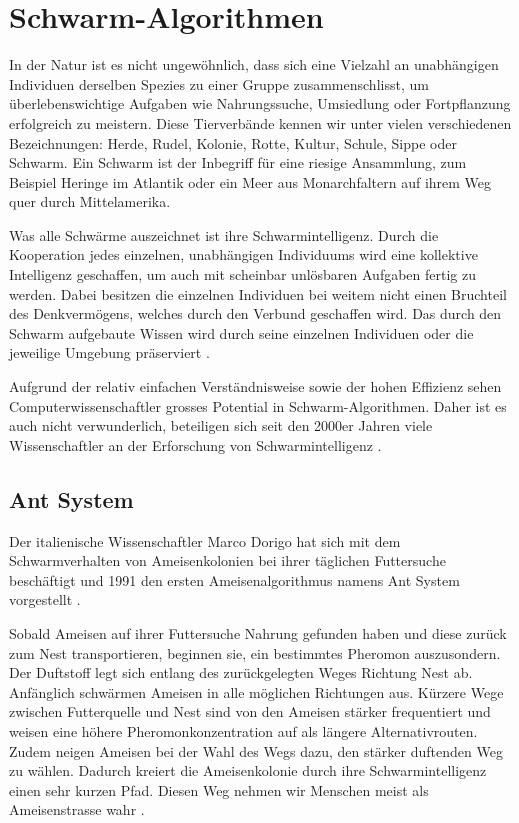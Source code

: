 \chapter{Schwarm-Algorithmen}

In der Natur ist es nicht ungewöhnlich, dass sich eine Vielzahl an unabhängigen Individuen
derselben Spezies zu einer Gruppe zusammenschlisst, um überlebenswichtige Aufgaben wie
Nahrungssuche, Umsiedlung oder Fortpflanzung erfolgreich zu meistern. Diese Tierverbände kennen
wir unter vielen verschiedenen Bezeichnungen: Herde, Rudel, Kolonie, Rotte, Kultur, Schule, Sippe
oder Schwarm. Ein Schwarm ist der Inbegriff für eine riesige Ansammlung, zum Beispiel Heringe im Atlantik
oder ein Meer aus Monarchfaltern auf ihrem Weg quer durch Mittelamerika.

Was alle Schwärme auszeichnet ist ihre Schwarmintelligenz. Durch die Kooperation jedes einzelnen,
unabhängigen Individuums wird eine kollektive Intelligenz geschaffen, um auch mit scheinbar
unlösbaren Aufgaben fertig zu werden. Dabei besitzen die einzelnen Individuen bei weitem nicht
einen Bruchteil des Denkvermögens, welches durch den Verbund geschaffen wird. Das durch den Schwarm
aufgebaute Wissen wird durch seine einzelnen Individuen oder die jeweilige Umgebung präserviert
\cite[Kap. 6.1]{Bro11}.

Aufgrund der relativ einfachen Verständnisweise sowie der hohen Effizienz sehen Computerwissenschaftler
grosses Potential in Schwarm-Algorithmen. Daher ist es auch nicht verwunderlich, beteiligen sich seit
den 2000er Jahren viele Wissenschaftler an der Erforschung von Schwarmintelligenz \cite{LL18}.

\section{Ant System}
Der italienische Wissenschaftler Marco Dorigo hat sich mit dem Schwarmverhalten von Ameisenkolonien bei 
ihrer täglichen Futtersuche beschäftigt und 1991 den ersten Ameisenalgorithmus namens Ant System
vorgestellt \cite{Wiki03}.

Sobald Ameisen auf ihrer Futtersuche Nahrung gefunden haben und diese zurück zum Nest transportieren, beginnen
sie, ein bestimmtes Pheromon auszusondern. Der Duftstoff legt sich entlang des zurückgelegten Weges Richtung
Nest ab. Anfänglich schwärmen Ameisen in alle möglichen Richtungen aus. Kürzere Wege zwischen Futterquelle und
Nest sind von den Ameisen stärker frequentiert und weisen eine höhere Pheromonkonzentration auf als
längere Alternativrouten. Zudem neigen Ameisen bei der Wahl des Wegs dazu, den stärker duftenden Weg zu wählen.
Dadurch kreiert die Ameisenkolonie durch ihre Schwarmintelligenz einen sehr kurzen Pfad. Diesen Weg nehmen wir
Menschen meist als Ameisenstrasse wahr \cite[Kap. 6.3]{Bro11}.

